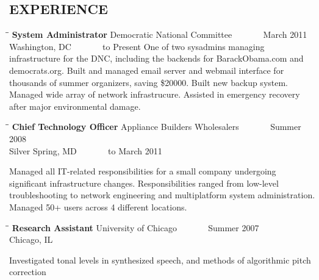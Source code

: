 \documentclass{res}
\begin{document}
\begin{resume}
\section{EXPERIENCE}
   \vspace{-0.1in}	
   \begin{tabbing}
   \hspace{2.3in}\= \hspace{2.6in}\= \kill %
    {\bf System Administrator} \>Democratic National Committee \> ~~~~~~ March 2011 \\
                             \>Washington, DC                    \> ~~~~~~ to Present
   One of two sysadmins managing infrastructure for the DNC, including the backends for BarackObama.com and democrats.org. Built and managed email server and webmail interface for thousands of summer organizers, saving \$20000. Built new backup system. Managed wide array of network infrastrucure. Assisted in emergency recovery after major environmental damage.
   \end{tabbing}\vspace{-20pt}      %
   \begin{tabbing}
   \hspace{2.3in}\= \hspace{2.6in}\= \kill %
    {\bf Chief Technology Officer} \>Appliance Builders Wholesalers \> ~~~~~~ Summer 2008 \\
                             \>Silver Spring, MD                    \> ~~~~~~ to March 2011
   \end{tabbing}\vspace{-20pt}      %
    Managed all IT-related responsibilities for a small company undergoing significant infrastructure changes. Responsibilities ranged from low-level troubleshooting to network engineering and multiplatform system administration. Managed 50+ users across 4 different locations.
   \begin{tabbing}
   \hspace{2.3in}\= \hspace{2.6in}\= \kill %
    {\bf Research Assistant} \>University of Chicago \> ~~~~~~ Summer 2007\\
                          \>Chicago, IL
   \end{tabbing}\vspace{-20pt}
   Investigated tonal levels in synthesized speech, and methods of algorithmic pitch correction

\end{resume}
\end{document}
